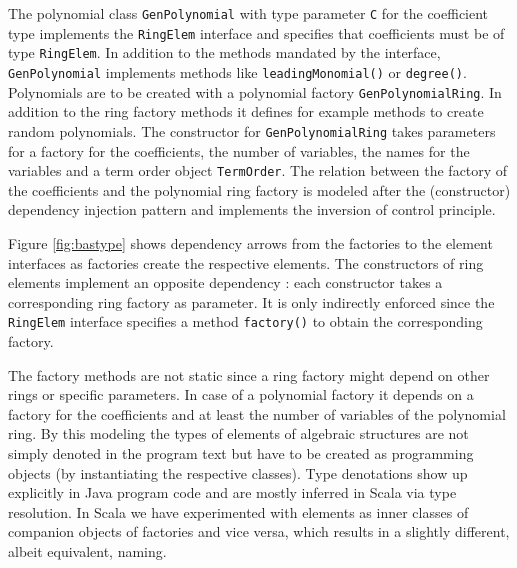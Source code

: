 \documentclass{llncs}
\newcommand{\code}[1]{\texttt{#1}}
\begin{document}

The polynomial class \code{Gen\-Polynomial} with type parameter
\code{C} for the coefficient type implements the \code{Ring\-Elem}
interface and specifies that coefficients must be of type
\code{Ring\-Elem}.  In addition to the methods mandated by the
interface, \code{Gen\-Polynomial} implements methods like
\code{leading\-Monomial()} or \code{degree()}.  Polynomials are to be
created with a polynomial factory \code{Gen\-Polynomial\-Ring}. In
addition to the ring factory methods it defines for example methods
to create random polynomials.  The constructor for
\code{Gen\-Polynomial\-Ring} takes parameters for a factory for the
coefficients, the number of variables, the names for the variables and
a term order object \code{Term\-Order}. The relation between the
factory of the coefficients and the polynomial ring factory is modeled
after the (constructor) dependency injection pattern and implements the
inversion of control principle.

Figure \ref{fig:bastype} shows dependency arrows from the factories to
the element interfaces as factories create the respective elements.
The constructors of ring elements implement an opposite
dependency : each constructor takes a corresponding ring
factory as parameter.  It is only indirectly enforced since the
\code{RingElem} interface specifies a method \code{factory()} to
obtain the corresponding factory.

The factory methods are not static 
since a ring factory might depend on other rings or specific
parameters. In case of a polynomial factory it depends on a factory
for the coefficients and at least the number of variables of the
polynomial ring. By this modeling the types of elements of algebraic
structures are not simply denoted in the program text but have to be
created as programming objects (by instantiating the respective
classes). Type denotations show up explicitly in Java program code and
are mostly inferred in Scala via type resolution. In Scala we have
experimented with elements as inner classes of companion objects of
factories and vice versa, which results in a slightly different,
albeit equivalent, naming.
\end{document}
